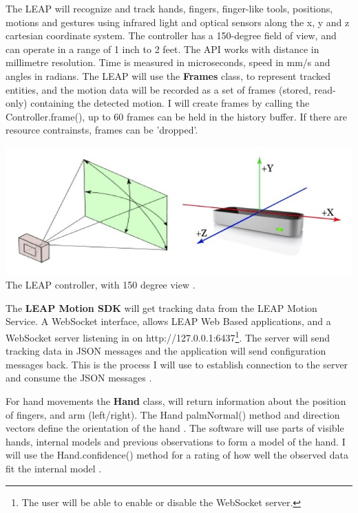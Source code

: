 \documentclass[a4paper, 10pt]{article}
\begin{document}
The LEAP will recognize and track hands, fingers, finger-like tools, positions, motions and gestures using infrared light and optical sensors along the x, y and z cartesian coordinate system. The controller has a 150-degree field of view, and can operate in a range of 1 inch to 2 feet. The API works with distance in millimetre resolution. Time is measured in microseconds, speed in mm/s and angles in radians. The LEAP will use the \textbf{Frames} class, to represent tracked entities, and the motion data will be recorded as a set of frames (stored, read-only) containing the detected motion. I will create frames by calling the Controller.frame(), up to 60 frames can be held in the history buffer. If there are resource contrainsts, frames can be 'dropped'.

\begin{center}
\includegraphics[scale=0.4]{leap}\\
The LEAP controller, with 150 degree view \cite{leap}.
\end{center}

The \textbf{LEAP Motion SDK} will get tracking data from the LEAP Motion Service. A WebSocket interface, allows LEAP Web Based applications, and a WebSocket server listening in on http://127.0.0.1:6437\footnote{The user will be able to enable or disable the WebSocket server.}. The server will send tracking data in JSON messages and the application will send configuration messages back. This is the process I will use to establish connection to the server and consume the JSON messages \cite{leap}. 

For hand movements the \textbf{Hand} class, will return information about the position of fingers, and arm (left/right). The Hand palmNormal() method and direction vectors define the orientation of the hand \cite{leap}. The software will use parts of visible hands, internal models and previous observations to form a model of the hand. I will use the Hand.confidence() method for a rating of how well the observed data fit the internal model \cite{leap}.
\end{document}
